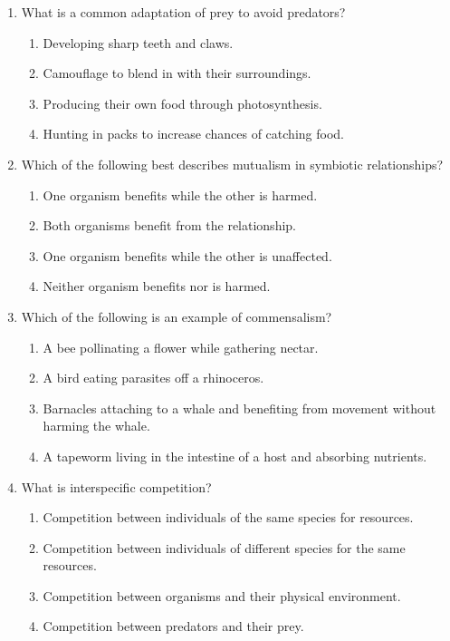 \documentclass{article}
\begin{document}
\begin{enumerate}
    \item What is a common adaptation of prey to avoid predators?
    \begin{enumerate}
        \item Developing sharp teeth and claws.
        \item Camouflage to blend in with their surroundings.
        \item Producing their own food through photosynthesis.
        \item Hunting in packs to increase chances of catching food.
    \end{enumerate}

    \item Which of the following best describes mutualism in symbiotic relationships?
    \begin{enumerate}
        \item One organism benefits while the other is harmed.
        \item Both organisms benefit from the relationship.
        \item One organism benefits while the other is unaffected.
        \item Neither organism benefits nor is harmed.
    \end{enumerate}

    \item Which of the following is an example of commensalism?
    \begin{enumerate}
        \item A bee pollinating a flower while gathering nectar.
        \item A bird eating parasites off a rhinoceros.
        \item Barnacles attaching to a whale and benefiting from movement without harming the whale.
        \item A tapeworm living in the intestine of a host and absorbing nutrients.
    \end{enumerate}

    \item What is interspecific competition?
    \begin{enumerate}
        \item Competition between individuals of the same species for resources.
        \item Competition between individuals of different species for the same resources.
        \item Competition between organisms and their physical environment.
        \item Competition between predators and their prey.
    \end{enumerate}


\end{enumerate}
\end{document}

